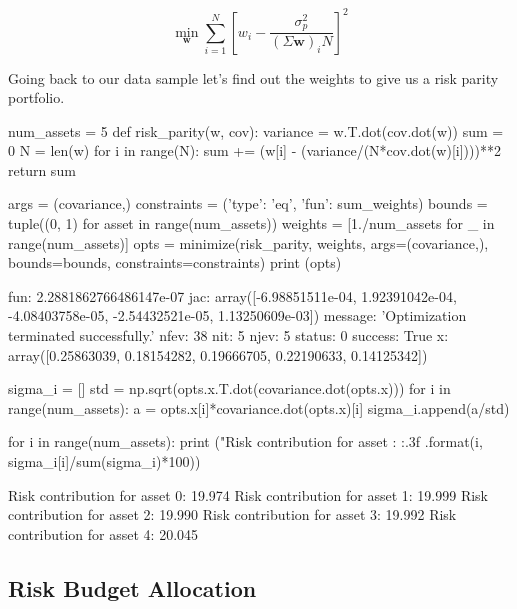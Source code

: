 \begin{equation} 
\underset{\mathbf{w}}{\min } \sum _{i=1}^{N}\left[w_{i}-{\frac {\sigma_p^{2}}{(\Sigma \mathbf{w})_{i}N}}\right]^{2} 
\end{equation}

Going back to our data sample let's find out the weights to give us a risk parity portfolio.

\begin{ipython}
	num_assets = 5
	def risk_parity(w, cov):
	variance = w.T.dot(cov.dot(w))
	sum = 0
	N = len(w)
	for i in range(N):
	sum += (w[i] - (variance/(N*cov.dot(w)[i])))**2
	return sum
	
	args = (covariance,)
	constraints = ({'type': 'eq', 'fun': sum_weights})
	bounds = tuple((0, 1) for asset in range(num_assets))
	weights = [1./num_assets for _ in range(num_assets)]
	opts = minimize(risk_parity, weights, args=(covariance,),
	bounds=bounds, constraints=constraints)
	print (opts)
\end{ipython}
\begin{ioutput}
	fun: 2.2881862766486147e-07
	jac: array([-6.98851511e-04,  1.92391042e-04, -4.08403758e-05, 
	-2.54432521e-05,  1.13250609e-03])
	message: 'Optimization terminated successfully.'
	nfev: 38
	nit: 5
	njev: 5
	status: 0
	success: True
	x: array([0.25863039, 0.18154282, 0.19666705, 0.22190633, 
	0.14125342])
\end{ioutput}

\begin{ipython}
	sigma_i = []
	std = np.sqrt(opts.x.T.dot(covariance.dot(opts.x)))
	for i in range(num_assets):
	a = opts.x[i]*covariance.dot(opts.x)[i]
	sigma_i.append(a/std)
	
	for i in range(num_assets):
	print ("Risk contribution for asset {}: {:.3f}%
	.format(i, sigma_i[i]/sum(sigma_i)*100))
\end{ipython}
\begin{ioutput}
	Risk contribution for asset 0: 19.974%
	Risk contribution for asset 1: 19.999%
	Risk contribution for asset 2: 19.990%
	Risk contribution for asset 3: 19.992%
	Risk contribution for asset 4: 20.045%
\end{ioutput}


\subsection{Risk Budget Allocation}
\label{risk-budget-allocation}

